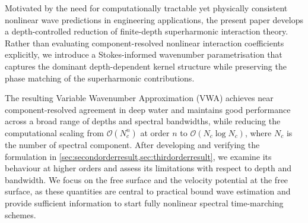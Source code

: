 \documentclass[lineno]{JFM-FLM_Au}
\begin{document}

Motivated by the need for computationally tractable yet physically consistent nonlinear wave predictions in engineering applications, the present paper develops a depth-controlled reduction of finite-depth superharmonic interaction theory. Rather than evaluating component-resolved nonlinear interaction coefficients explicitly, we introduce a Stokes-informed wavenumber parametrisation that captures the dominant depth-dependent kernel structure while preserving the phase matching of the superharmonic contributions.

The resulting Variable Wavenumber Approximation (VWA) achieves near component-resolved agreement in deep water and maintains good performance across a broad range of depths and spectral bandwidths, while reducing the computational scaling from $\mathcal{O}(N_c^n)$ at order $n$ to $\mathcal{O}(N_c\log N_c)$, where $N_c$ is the number of spectral component. After developing and verifying the formulation in \cref{sec:secondorderresult,sec:thirdorderresult}, we examine its behaviour at higher orders and assess its limitations with respect to depth and bandwidth. We focus on the free surface and the velocity potential at the free surface, as these quantities are central to practical bound wave estimation and provide sufficient information to start fully nonlinear spectral time-marching schemes.
\end{document}
